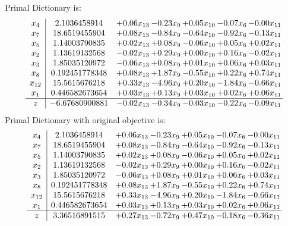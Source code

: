 \documentclass[9pt]{article}
\begin{document}
Primal Dictionary is:
\[\begin{array}{c| c c@{\hskip 2pt} c@{\hskip 2pt} c@{\hskip 2pt} c@{\hskip 2pt} c@{\hskip 2pt} }
 x_{4}   &  2.1036458914 & +  0.06 x_{13} & -0.23 x_{9} & +  0.05 x_{10} & -0.07 x_{6} & -0.00 x_{11}\\
 x_{7}   &  18.6519455904 & +  0.08 x_{13} & -0.84 x_{9} & -0.64 x_{10} & -0.92 x_{6} & -0.13 x_{11}\\
 x_{5}   &  1.14003790835 & +  0.02 x_{13} & +  0.08 x_{9} & -0.06 x_{10} & +  0.05 x_{6} & +  0.02 x_{11}\\
 x_{2}   &  1.13619132568 & -0.02 x_{13} & +  0.29 x_{9} & +  0.00 x_{10} & +  0.16 x_{6} & -0.02 x_{11}\\
 x_{3}   &  1.85035120972 & -0.06 x_{13} & +  0.08 x_{9} & +  0.01 x_{10} & +  0.06 x_{6} & +  0.03 x_{11}\\
 x_{8}   &  0.192451778348 & +  0.08 x_{13} & +  1.87 x_{9} & -0.55 x_{10} & +  0.22 x_{6} & +  0.74 x_{11}\\
 x_{12}   &  15.5615676218 & +  0.33 x_{13} & -4.96 x_{9} & +  0.20 x_{10} & -1.84 x_{6} & -0.66 x_{11}\\
 x_{1}   &  0.446582673654 & +  0.03 x_{13} & +  0.13 x_{9} & +  0.03 x_{10} & +  0.02 x_{6} & +  0.06 x_{11}\\
\hline
z    &  -6.67680900881 & -0.02 x_{13} & -0.34 x_{9} & -0.03 x_{10} & -0.22 x_{6} & -0.09 x_{11}\\
\end{array}\]
Primal Dictionary with original objective is:
\[\begin{array}{c| c c@{\hskip 2pt} c@{\hskip 2pt} c@{\hskip 2pt} c@{\hskip 2pt} c@{\hskip 2pt} }
 x_{4}   &  2.1036458914 & +  0.06 x_{13} & -0.23 x_{9} & +  0.05 x_{10} & -0.07 x_{6} & -0.00 x_{11}\\
 x_{7}   &  18.6519455904 & +  0.08 x_{13} & -0.84 x_{9} & -0.64 x_{10} & -0.92 x_{6} & -0.13 x_{11}\\
 x_{5}   &  1.14003790835 & +  0.02 x_{13} & +  0.08 x_{9} & -0.06 x_{10} & +  0.05 x_{6} & +  0.02 x_{11}\\
 x_{2}   &  1.13619132568 & -0.02 x_{13} & +  0.29 x_{9} & +  0.00 x_{10} & +  0.16 x_{6} & -0.02 x_{11}\\
 x_{3}   &  1.85035120972 & -0.06 x_{13} & +  0.08 x_{9} & +  0.01 x_{10} & +  0.06 x_{6} & +  0.03 x_{11}\\
 x_{8}   &  0.192451778348 & +  0.08 x_{13} & +  1.87 x_{9} & -0.55 x_{10} & +  0.22 x_{6} & +  0.74 x_{11}\\
 x_{12}   &  15.5615676218 & +  0.33 x_{13} & -4.96 x_{9} & +  0.20 x_{10} & -1.84 x_{6} & -0.66 x_{11}\\
 x_{1}   &  0.446582673654 & +  0.03 x_{13} & +  0.13 x_{9} & +  0.03 x_{10} & +  0.02 x_{6} & +  0.06 x_{11}\\
\hline
z    &  3.36516891515 & +  0.27 x_{13} & -0.72 x_{9} & +  0.47 x_{10} & -0.18 x_{6} & -0.36 x_{11}\\
\end{array}\]
\end{document}
